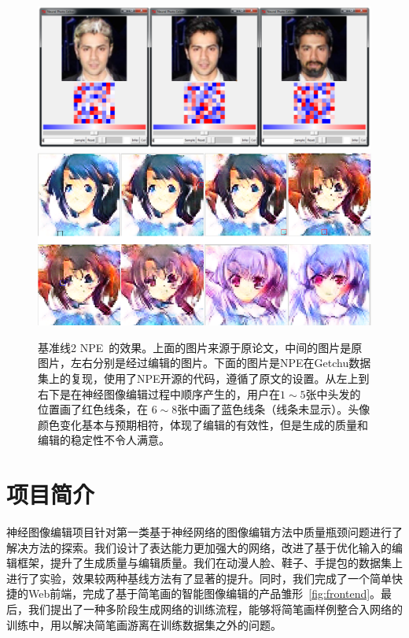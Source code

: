\documentclass[a4paper,12pt,UTF8]{ctexart}
\newcommand{\kai}{\CJKfamily{zhkai}}	%
\begin{document}
\begin{figure}[H]
  \centering
  \includegraphics[width=0.7\linewidth]{figs/baseline_face.PNG}
  \includegraphics[width=0.9\linewidth]{figs/baseline2.PNG}
  \caption{\kai 基准线2 NPE~\cite{Brock2016Neural}的效果。上面的图片来源于原论文，中间的图片是原图片，左右分别是经过编辑的图片。下面的图片是NPE在Getchu数据集上的复现，使用了NPE开源的代码，遵循了原文的设置。从左上到右下是在神经图像编辑过程中顺序产生的，用户在$1\sim5$张中头发的位置画了红色线条，在 $6\sim8$张中画了蓝色线条（线条未显示）。头像颜色变化基本与预期相符，体现了编辑的有效性，但是生成的质量和编辑的稳定性不令人满意。}
  \label{fig:baseline2}
\end{figure}

\section{项目简介}

神经图像编辑项目针对第一类基于神经网络的图像编辑方法中质量瓶颈问题进行了解决方法的探索。我们设计了表达能力更加强大的网络，改进了基于优化输入的编辑框架，提升了生成质量与编辑质量。我们在动漫人脸、鞋子、手提包的数据集上进行了实验，效果较两种基线方法有了显著的提升。同时，我们完成了一个简单快捷的Web前端，完成了基于简笔画的智能图像编辑的产品雏形~\ref{fig:frontend}。最后，我们提出了一种多阶段生成网络的训练流程，能够将简笔画样例整合入网络的训练中，用以解决简笔画游离在训练数据集之外的问题。
\end{document}
